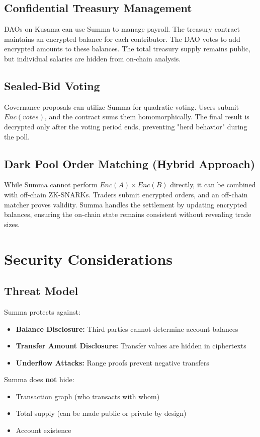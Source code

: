 \documentclass[11pt,a4paper]{article}
\begin{document}
\subsection{Confidential Treasury Management}
DAOs on Kusama can use Summa to manage payroll. The treasury contract maintains an encrypted balance for each contributor. The DAO votes to add encrypted amounts to these balances. The total treasury supply remains public, but individual salaries are hidden from on-chain analysis.

\subsection{Sealed-Bid Voting}
Governance proposals can utilize Summa for quadratic voting. Users submit $Enc(votes)$, and the contract sums them homomorphically. The final result is decrypted only after the voting period ends, preventing "herd behavior" during the poll.

\subsection{Dark Pool Order Matching (Hybrid Approach)}
While Summa cannot perform $Enc(A) \times Enc(B)$ directly, it can be combined with off-chain ZK-SNARKs. Traders submit encrypted orders, and an off-chain matcher proves validity. Summa handles the settlement by updating encrypted balances, ensuring the on-chain state remains consistent without revealing trade sizes.

\section{Security Considerations}

\subsection{Threat Model}
Summa protects against:
\begin{itemize}
    \item \textbf{Balance Disclosure:} Third parties cannot determine account balances
    \item \textbf{Transfer Amount Disclosure:} Transfer values are hidden in ciphertexts
    \item \textbf{Underflow Attacks:} Range proofs prevent negative transfers
\end{itemize}

Summa does \textbf{not} hide:
\begin{itemize}
    \item Transaction graph (who transacts with whom)
    \item Total supply (can be made public or private by design)
    \item Account existence
\end{itemize}
\end{document}
